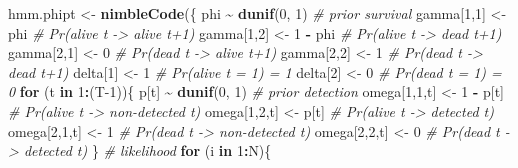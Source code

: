 \documentclass[
  12pt,
]{krantz}
\newenvironment{Shaded}{\begin{snugshade}}{\end{snugshade}}
\newcommand{\CommentTok}[1]{\textcolor[rgb]{0.56,0.35,0.01}{\textit{#1}}}
\newcommand{\ControlFlowTok}[1]{\textcolor[rgb]{0.13,0.29,0.53}{\textbf{#1}}}
\newcommand{\DecValTok}[1]{\textcolor[rgb]{0.00,0.00,0.81}{#1}}
\newcommand{\FunctionTok}[1]{\textcolor[rgb]{0.13,0.29,0.53}{\textbf{#1}}}
\newcommand{\NormalTok}[1]{#1}
\newcommand{\OtherTok}[1]{\textcolor[rgb]{0.56,0.35,0.01}{#1}}
\newcommand{\SpecialCharTok}[1]{\textcolor[rgb]{0.81,0.36,0.00}{\textbf{#1}}}
\begin{document}
\begin{Shaded}
\begin{Highlighting}[]
\NormalTok{hmm.phipt }\OtherTok{\textless{}{-}} \FunctionTok{nimbleCode}\NormalTok{(\{}
\NormalTok{  phi }\SpecialCharTok{\textasciitilde{}} \FunctionTok{dunif}\NormalTok{(}\DecValTok{0}\NormalTok{, }\DecValTok{1}\NormalTok{) }\CommentTok{\# prior survival}
\NormalTok{  gamma[}\DecValTok{1}\NormalTok{,}\DecValTok{1}\NormalTok{] }\OtherTok{\textless{}{-}}\NormalTok{ phi      }\CommentTok{\# Pr(alive t {-}\textgreater{} alive t+1)}
\NormalTok{  gamma[}\DecValTok{1}\NormalTok{,}\DecValTok{2}\NormalTok{] }\OtherTok{\textless{}{-}} \DecValTok{1} \SpecialCharTok{{-}}\NormalTok{ phi  }\CommentTok{\# Pr(alive t {-}\textgreater{} dead t+1)}
\NormalTok{  gamma[}\DecValTok{2}\NormalTok{,}\DecValTok{1}\NormalTok{] }\OtherTok{\textless{}{-}} \DecValTok{0}        \CommentTok{\# Pr(dead t {-}\textgreater{} alive t+1)}
\NormalTok{  gamma[}\DecValTok{2}\NormalTok{,}\DecValTok{2}\NormalTok{] }\OtherTok{\textless{}{-}} \DecValTok{1}        \CommentTok{\# Pr(dead t {-}\textgreater{} dead t+1)}
\NormalTok{  delta[}\DecValTok{1}\NormalTok{] }\OtherTok{\textless{}{-}} \DecValTok{1}          \CommentTok{\# Pr(alive t = 1) = 1}
\NormalTok{  delta[}\DecValTok{2}\NormalTok{] }\OtherTok{\textless{}{-}} \DecValTok{0}          \CommentTok{\# Pr(dead t = 1) = 0}
  \ControlFlowTok{for}\NormalTok{ (t }\ControlFlowTok{in} \DecValTok{1}\SpecialCharTok{:}\NormalTok{(T}\DecValTok{{-}1}\NormalTok{))\{}
\NormalTok{    p[t] }\SpecialCharTok{\textasciitilde{}} \FunctionTok{dunif}\NormalTok{(}\DecValTok{0}\NormalTok{, }\DecValTok{1}\NormalTok{) }\CommentTok{\# prior detection}
\NormalTok{    omega[}\DecValTok{1}\NormalTok{,}\DecValTok{1}\NormalTok{,t] }\OtherTok{\textless{}{-}} \DecValTok{1} \SpecialCharTok{{-}}\NormalTok{ p[t]    }\CommentTok{\# Pr(alive t {-}\textgreater{} non{-}detected t)}
\NormalTok{    omega[}\DecValTok{1}\NormalTok{,}\DecValTok{2}\NormalTok{,t] }\OtherTok{\textless{}{-}}\NormalTok{ p[t]        }\CommentTok{\# Pr(alive t {-}\textgreater{} detected t)}
\NormalTok{    omega[}\DecValTok{2}\NormalTok{,}\DecValTok{1}\NormalTok{,t] }\OtherTok{\textless{}{-}} \DecValTok{1}        \CommentTok{\# Pr(dead t {-}\textgreater{} non{-}detected t)}
\NormalTok{    omega[}\DecValTok{2}\NormalTok{,}\DecValTok{2}\NormalTok{,t] }\OtherTok{\textless{}{-}} \DecValTok{0}        \CommentTok{\# Pr(dead t {-}\textgreater{} detected t)}
\NormalTok{  \}}
  \CommentTok{\# likelihood}
  \ControlFlowTok{for}\NormalTok{ (i }\ControlFlowTok{in} \DecValTok{1}\SpecialCharTok{:}\NormalTok{N)\{}

\end{Highlighting}
\end{Shaded}
\end{document}

